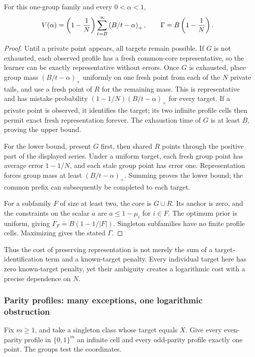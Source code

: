 \begin{proposition}\label{gm:prop:private}
For this one-group family and every $0<\alpha<1$,
\[
V(\alpha)=\left(1-\frac1N\right)
\sum_{t=B}^{\infty}\left(B/t-\alpha\right)_+,
\qquad \Gamma=B\left(1-\frac1N\right).
\]
\end{proposition}
\begin{proof}
Until a private point appears, all targets remain possible. If $G$ is not exhausted, each observed profile has a fresh common-core representative, so the learner can be exactly representative without errors. Once $G$ is exhausted, place group mass $(B/t-\alpha)_+$ uniformly on one fresh point from each of the $N$ private tails, and use a fresh point of $R$ for the remaining mass. This is representative and has mistake probability $(1-1/N)(B/t-\alpha)_+$ for every target. If a private point is observed, it identifies the target; its two infinite profile cells then permit exact fresh representation forever. The exhaustion time of $G$ is at least $B$, proving the upper bound.

For the lower bound, present $G$ first, then shared $R$ points through the positive part of the displayed series. Under a uniform target, each fresh group point has average error $1-1/N$, and each stale group point has error one. Representation forces group mass at least $(B/t-\alpha)_+$. Summing proves the lower bound; the common prefix can subsequently be completed to each target.

For a subfamily $F$ of size at least two, the core is $G\cup R$. Its anchor is zero, and the constraints on the scalar $a$ are $a\le1-\mu_i$ for $i\in F$. The optimum prior is uniform, giving $\Gamma_F=B(1-1/|F|)$. Singleton subfamilies have no finite profile cells. Maximizing gives the stated $\Gamma$.
\end{proof}
Thus the cost of preserving representation is not merely the sum of a target-identification term and a known-target penalty. Every individual target here has zero known-target penalty, yet their ambiguity creates a logarithmic cost with a precise dependence on $N$.

\subsubsection{Parity profiles: many exceptions, one logarithmic obstruction}
Fix $m\ge1$, and take a singleton class whose target equals $X$. Give every even-parity profile in $\{0,1\}^m$ an infinite cell and every odd-parity profile exactly one point. The groups test the coordinates.

